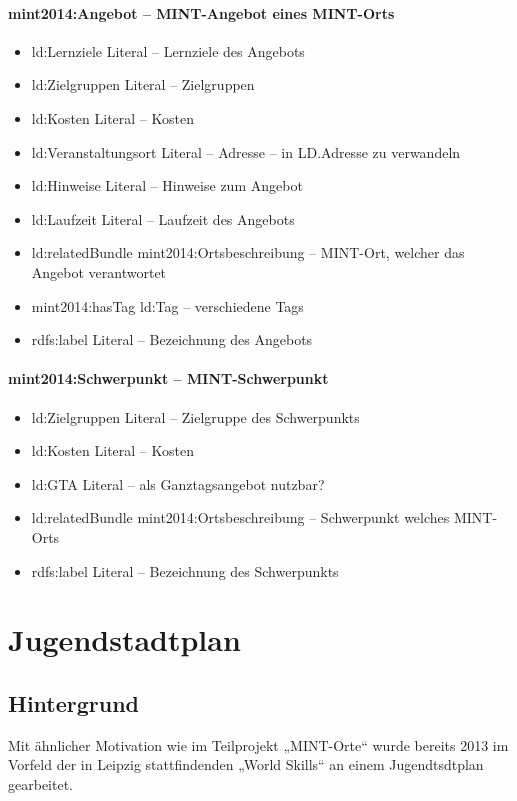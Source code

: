 \documentclass[a4paper,11pt]{article}
\begin{document}
\paragraph{mint2014:Angebot – MINT-Angebot eines MINT-Orts}
\begin{itemize}
\item ld:Lernziele Literal – Lernziele des Angebots
\item ld:Zielgruppen Literal – Zielgruppen
\item ld:Kosten Literal – Kosten
\item ld:Veranstaltungsort Literal – Adresse – in LD.Adresse zu verwandeln
\item ld:Hinweise Literal – Hinweise zum Angebot
\item ld:Laufzeit Literal – Laufzeit des Angebots
\item ld:relatedBundle mint2014:Ortsbeschreibung – MINT-Ort, welcher das
  Angebot verantwortet
\item mint2014:hasTag ld:Tag – verschiedene Tags
\item rdfs:label Literal – Bezeichnung des Angebots
\end{itemize}
\paragraph{mint2014:Schwerpunkt – MINT-Schwerpunkt}
\begin{itemize}
\item ld:Zielgruppen Literal – Zielgruppe des Schwerpunkts
\item ld:Kosten Literal – Kosten
\item ld:GTA Literal – als Ganztagsangebot nutzbar?
\item ld:relatedBundle mint2014:Ortsbeschreibung – Schwerpunkt welches
  MINT-Orts
\item rdfs:label Literal – Bezeichnung des Schwerpunkts
\end{itemize}
\newpage

\section{Jugendstadtplan}

\subsection{Hintergrund}
Mit ähnlicher Motivation wie im Teilprojekt „MINT-Orte“ wurde bereits 2013 im
Vorfeld der in Leipzig stattfindenden „World Skills“ an einem Jugendtsdtplan
gearbeitet. 
\end{document}
